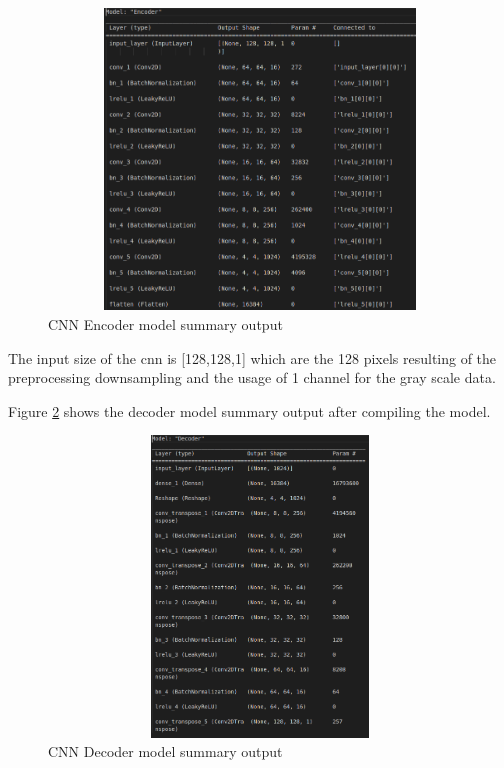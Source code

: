 \begin{figure}[ht]
    \centering
    \includegraphics[width = 14cm, height = 8cm]{images/cnn-encoder-output.png}
    \caption[CNN Encoder model summary output]{CNN Encoder model summary output}
    \label{fig:cnnencoderoutput}
\end{figure}

The input size of the \acrshort*{cnn} is [128,128,1] which are the 128 pixels resulting of the preprocessing downsampling and the usage of 1 channel for the gray scale data.

Figure \ref{fig:cnndecoderoutput} shows the decoder model summary output after compiling the model.

\begin{figure}[ht]
    \centering
    \includegraphics[width = 14cm, height = 8cm]{images/cnn-decoder-output.png}
    \caption[CNN Decoder model summary output]{CNN Decoder model summary output}
    \label{fig:cnndecoderoutput}
\end{figure}

